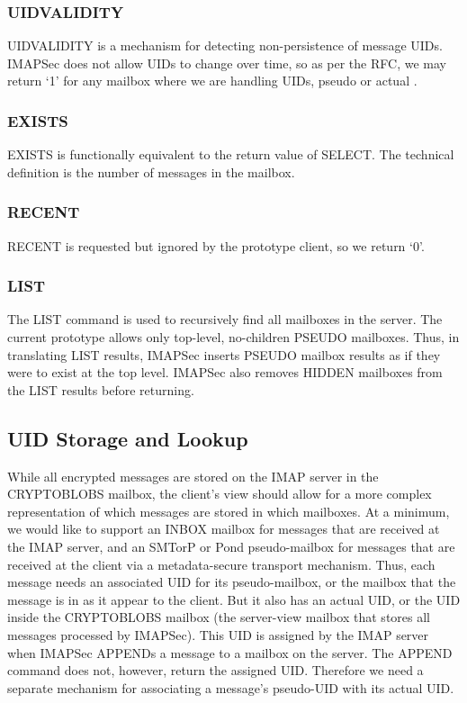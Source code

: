 \documentclass[pageno]{jpaper}
\newcommand{\project}{IMAPSec }
\newcommand{\projectnospace}{IMAPSec}
\begin{document}
\subsubsection{UIDVALIDITY} UIDVALIDITY is a mechanism for detecting non-persistence of message UIDs. \project does not allow UIDs to change over time, so as per the RFC, we may return `1' for any mailbox where we are handling UIDs, pseudo or actual \cite{rfc3501}.

\subsubsection{EXISTS}
\label{exists}

EXISTS is functionally equivalent to the return value of SELECT. The technical definition is the number of messages in the mailbox.

\subsubsection{RECENT} RECENT is requested but ignored by the prototype client, so we return `0'.

\subsubsection{LIST} The LIST command is used to recursively find all mailboxes in the server. The current prototype allows only top-level, no-children PSEUDO mailboxes. Thus, in translating LIST results, \project inserts PSEUDO mailbox results as if they were to exist at the top level. \project also removes HIDDEN mailboxes from the LIST results before returning.

\subsection{UID Storage and Lookup}
\label{uid-translation}

While all encrypted messages are stored on the IMAP server in the CRYPTOBLOBS mailbox, the client's view should allow for a more complex representation of which messages are stored in which mailboxes. At a minimum, we would like to support an INBOX mailbox for messages that are received at the IMAP server, and an SMTorP or Pond pseudo-mailbox for messages that are received at the client via a metadata-secure transport mechanism. Thus, each message needs an associated UID for its pseudo-mailbox, or the mailbox that the message is in as it appear to the client. But it also has an actual UID, or the UID inside the CRYPTOBLOBS mailbox (the server-view mailbox that stores all messages processed by \projectnospace). This UID is assigned by the IMAP server when \project APPENDs a message to a mailbox on the server. The APPEND command does not, however, return the assigned UID. Therefore we need a separate mechanism for associating a message's pseudo-UID with its actual UID.
\end{document}
